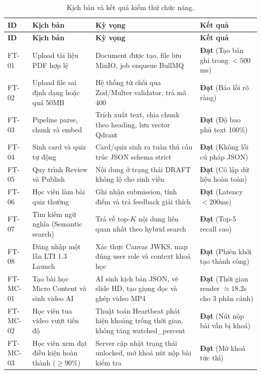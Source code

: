 \begin{longtable}{|p{1.8cm}|p{4.2cm}|p{4.2cm}|p{3.6cm}|}
    \caption{Kịch bản và kết quả kiểm thử chức năng.} \label{tab:functional-tests-lvtn} \\
    \hline
    \textbf{ID} & \textbf{Kịch bản} & \textbf{Kỳ vọng} & \textbf{Kết quả} \\
    \hline
    \endfirsthead
    \hline
    \textbf{ID} & \textbf{Kịch bản} & \textbf{Kỳ vọng} & \textbf{Kết quả} \\
    \hline
    \endhead

    FT-01 & Upload tài liệu PDF hợp lệ & Document được tạo, file lưu MinIO, job enqueue BullMQ & \textbf{Đạt} (Tạo bản ghi trong $< 500$ms) \\ \hline
    FT-02 & Upload file sai định dạng hoặc quá 50MB & Hệ thống từ chối qua Zod/Multer validator, trả mã 400 & \textbf{Đạt} (Báo lỗi rõ ràng) \\ \hline
    FT-03 & Pipeline parse, chunk và embed & Trích xuất text, chia chunk theo heading, lưu vector Qdrant & \textbf{Đạt} (Độ bao phủ text 100\%) \\ \hline
    FT-04 & Sinh card và quiz tự động & Card/quiz sinh ra tuân thủ cấu trúc JSON schema strict & \textbf{Đạt} (Không lỗi cú pháp JSON) \\ \hline
    FT-05 & Quy trình Review và Publish & Nội dung ở trạng thái DRAFT không lộ cho sinh viên & \textbf{Đạt} (Cô lập dữ liệu hoàn toàn) \\ \hline
    FT-06 & Học viên làm bài quiz thường & Ghi nhận submission, tính điểm và trả feedback giải thích & \textbf{Đạt} (Latency $< 200$ms) \\ \hline
    FT-07 & Tìm kiếm ngữ nghĩa (Semantic search) & Trả về top-$K$ nội dung liên quan nhất theo hybrid search & \textbf{Đạt} (Top-5 recall cao) \\ \hline
    FT-08 & Đăng nhập một lần LTI 1.3 Launch & Xác thực Canvas JWKS, map đúng user role và context khoá học & \textbf{Đạt} (Phiên khởi tạo thành công) \\ \hline
    FT-MC-01 & Tạo bài học Micro Content và sinh video AI & AI sinh kịch bản JSON, vẽ slide HD, tạo giọng đọc và ghép video MP4 & \textbf{Đạt} (Thời gian render $\approx 18.2$s cho 3 phân cảnh) \\ \hline
    FT-MC-02 & Học viên tua video vượt tiến độ & Thuật toán Heartbeat phát hiện khoảng trống thời gian, không tăng watched\_percent & \textbf{Đạt} (Nút nộp bài vẫn bị khoá) \\ \hline
    FT-MC-03 & Học viên xem đạt điều kiện hoàn thành ($\ge 90\%$) & Server cập nhật trạng thái unlocked, mở khoá nút nộp bài kiểm tra & \textbf{Đạt} (Mở khoá tức thì) \\ \hline

\end{longtable}
